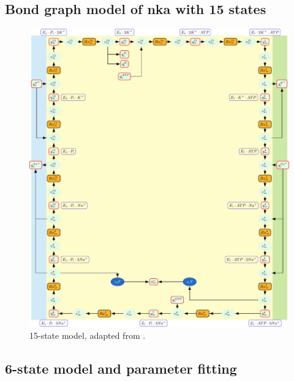 \documentclass{biophys-new}
\begin{document}
\subsection*{Bond graph model of \Gls{nka} with 15 states}


\cite{pan_cardiac_2020}


\begin{figure}
\caption{15-state model, adapted from \cite{pan_cardiac_2020}.}
\centering
\includegraphics[width=1\linewidth]{15state.pdf}
\end{figure}

\subsection*{6-state model and parameter fitting}
\end{document}

